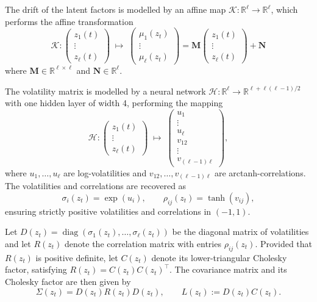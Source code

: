 \begin{description}[
    style=unboxed,
    leftmargin=0pt,
    labelindent=0pt,
    labelsep=0.5em
]

\item[Drift network.]

The drift of the latent factors is modelled by an affine map $\mathcal{K}:\mathbb{R}^\ell\rightarrow\mathbb{R}^\ell$, which performs the affine transformation
\[
\mathcal{K} :
\begin{pmatrix}
z_1(t) \\
\vdots \\
z_\ell(t)
\end{pmatrix}
\;\mapsto\;
\begin{pmatrix}
\mu_1(z_t) \\
\vdots \\
\mu_\ell(z_t)
\end{pmatrix}
=
\mathbf{M}
\begin{pmatrix}
z_1(t) \\
\vdots \\
z_\ell(t)
\end{pmatrix}
+
\mathbf{N}
\]
where $\mathbf{M}\in\mathbb{R}^{\ell\times \ell}$ and $\mathbf{N}\in\mathbb{R}^\ell$. 


\item[Volatility network.]
The volatility matrix is modelled by a neural network $\mathcal{H}:\mathbb{R}^{\ell}\rightarrow\mathbb{R}^{\ell+\ell(\ell-1)/2}$ with one hidden layer of width 4, performing the mapping
\[
\mathcal{H} :
\begin{pmatrix}
z_1(t) \\
\vdots \\
z_\ell(t)
\end{pmatrix}
\;\mapsto\;
\begin{pmatrix}
u_1 \\
\vdots \\
u_\ell \\
v_{12} \\
\vdots \\
v_{(\ell-1)\ell}
\end{pmatrix},
\]
where $u_1,\ldots,u_\ell$ are log-volatilities and $v_{12},\ldots,v_{(\ell-1)\ell}$ are arctanh-correlations. The volatilities and correlations are recovered as
\[
\sigma_i(z_t)=\exp(u_i), \qquad \rho_{ij}(z_t)=\tanh(v_{ij}),
\]
ensuring strictly positive volatilities and correlations in $(-1,1)$. 

Let $D(z_t) = \operatorname{diag}(\sigma_1(z_t), \ldots, \sigma_\ell(z_t))$ be the diagonal matrix of volatilities and let $R(z_t)$ denote the correlation matrix with entries $\rho_{ij}(z_t)$. Provided that $R(z_t)$ is positive definite, let $C(z_t)$ denote its lower-triangular Cholesky factor, satisfying $R(z_t) = C(z_t)C(z_t)^\top$. The covariance matrix and its Cholesky factor are then given by
\[
\Sigma(z_t) = D(z_t)R(z_t)D(z_t), \qquad L(z_t) := D(z_t)C(z_t).
\]




\end{description}
